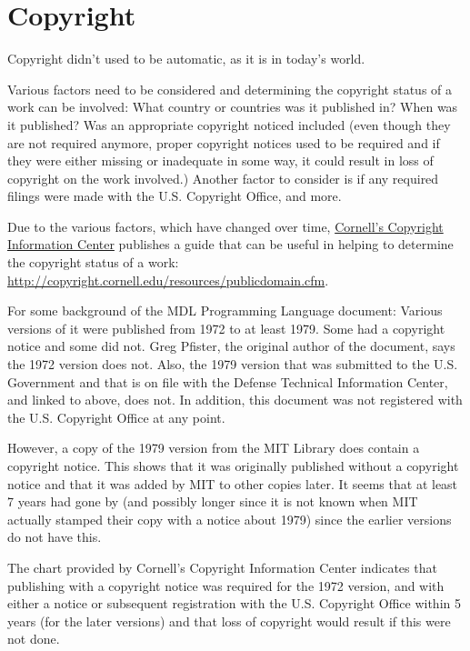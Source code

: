 \documentclass[a4paper]{scrbook}
\begin{document}
\section*{Copyright}\label{copyright}


Copyright didn't used to be automatic, as it is in today's world.

Various factors need to be considered and determining the copyright status of a work can be involved: What country or
countries was it published in? When was it published? Was an appropriate copyright noticed included (even though they are
not required anymore, proper copyright notices used to be required and if they were either missing or inadequate in some
way, it could result in loss of copyright on the work involved.) Another factor to consider is if any required filings were
made with the U.S. Copyright Office, and more.

Due to the various factors, which have changed over time, \href{http://copyright.cornell.edu/}{Cornell's Copyright
Information Center} publishes a guide that can be useful in helping to determine the copyright status of a work:
\url{http://copyright.cornell.edu/resources/publicdomain.cfm}.

For some background of the MDL Programming Language document: Various versions of it were published from 1972 to at least
1979. Some had a copyright notice and some did not. Greg Pfister, the original author of the document, says the 1972
version does not. Also, the 1979 version that was submitted to the U.S. Government and that is on file with the Defense
Technical Information Center, and linked to above, does not. In addition, this document was not registered with the U.S.
Copyright Office at any point.

However, a copy of the 1979 version from the MIT Library does contain a copyright notice. This shows that it was originally
published without a copyright notice and that it was added by MIT to other copies later. It seems that at least 7 years had
gone by (and possibly longer since it is not known when MIT actually stamped their copy with a notice about 1979) since the
earlier versions do not have this.

The chart provided by Cornell's Copyright Information Center indicates that publishing with a copyright notice was required
for the 1972 version, and with either a notice or subsequent registration with the U.S. Copyright Office within 5 years
(for the later versions) and that loss of copyright would result if this were not done.
\end{document}
